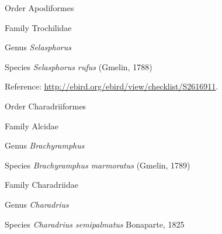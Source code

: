 \documentclass[9pt, article]{memoir}
\begin{document}
\begin{multicols}{2}
\vspace{6pt}\noindent\hspace{18pt}Order Apodiformes


\vspace{6pt}\noindent\hspace{24pt}Family Trochilidae


\vspace{6pt}\noindent\hspace{30pt}Genus \textit{Selasphorus}


\vspace{6pt}\noindent\hspace{36pt}Species \textit{Selasphorus rufus} (Gmelin, 1788)


\vspace{6pt}Reference: 
\url{http://ebird.org/ebird/view/checklist/S2616911}.

\vspace{6pt}\noindent\hspace{18pt}Order Charadriiformes


\vspace{6pt}\noindent\hspace{24pt}Family Alcidae


\vspace{6pt}\noindent\hspace{30pt}Genus \textit{Brachyramphus}


\vspace{6pt}\noindent\hspace{36pt}Species \textit{Brachyramphus marmoratus} (Gmelin, 1789)


\vspace{6pt}\noindent\hspace{24pt}Family Charadriidae


\vspace{6pt}\noindent\hspace{30pt}Genus \textit{Charadrius}


\vspace{6pt}\noindent\hspace{36pt}Species \textit{Charadrius semipalmatus} Bonaparte, 1825



\end{multicols}
\end{document}
